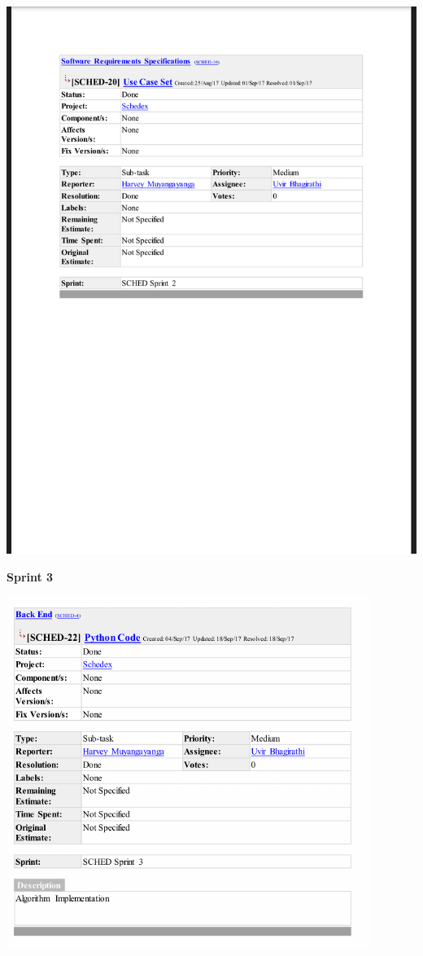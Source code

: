\documentclass{article}
\begin{document}
\centerline{\includegraphics[scale=0.4]{sprint2_12}}

\textbf{Sprint 3}

\centerline{\includegraphics[scale=1]{sprint3_1}}
\end{document}
